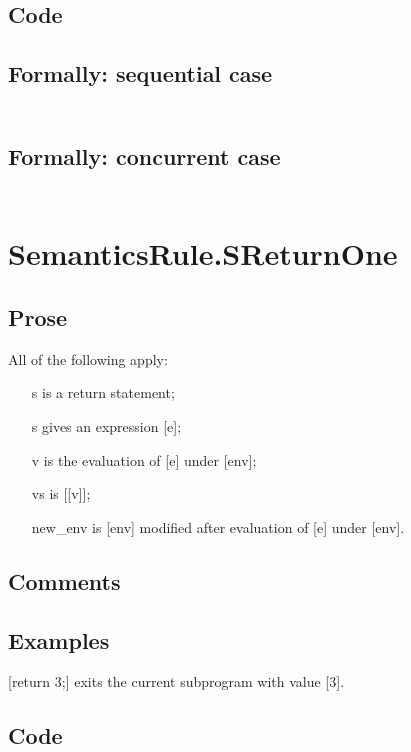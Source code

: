 \documentclass{book}
\begin{document}
  \subsection{Code}

  \subsection{Formally: sequential case}
  \begin{align}
  \end{align} 

  \subsection{Formally: concurrent case}
  \begin{align}
  \end{align} 

\section{SemanticsRule.SReturnOne \label{sec:SemanticsRule.SReturnOne}}

    \subsection{Prose}
    All of the following apply:
    \begin{itemize}
    \item [s] is a return statement;
    \item [s] gives an expression [e];
    \item [v] is the evaluation of [e] under [env];
    \item [vs] is [[v]];
    \item [new\_env] is [env] modified after evaluation of [e] under [env].
    \end{itemize}

    \subsection{Comments}

    \subsection{Examples}
    [return 3;] exits the current subprogram with value [3].

  \subsection{Code}
\end{document}
